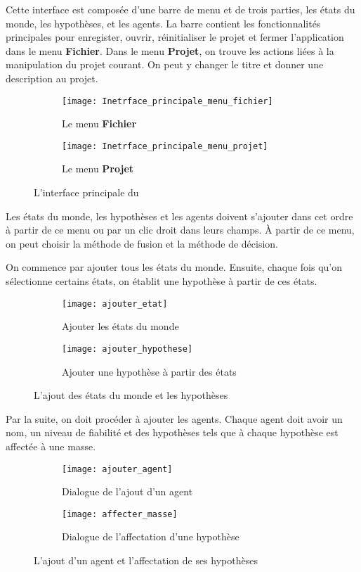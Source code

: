 Cette interface est composée d'une barre de menu et de trois parties, les états
du monde, les hypothèses, et les agents. La barre contient les fonctionnalités principales
pour enregister, ouvrir, réinitialiser le projet et fermer l'application dans le menu
\textbf{Fichier}. Dans le menu \textbf{Projet}, on trouve les actions liées à la manipulation
du projet courant. On peut y changer le titre et donner une description au projet.\\[1em]

\begin{figure}[H]
\begin{subfigure}{0.49\textwidth}
\texttt{[image: Inetrface\_principale\_menu\_fichier]}
\caption{Le menu \textbf{Fichier}}
\end{subfigure}
\hfill
\begin{subfigure}{0.49\textwidth}
\texttt{[image: Inetrface\_principale\_menu\_projet]}
\caption{Le menu \textbf{Projet}}
\end{subfigure}
\caption{L'interface principale du \appname}
\end{figure}

Les états du monde, les hypothèses et les agents doivent s'ajouter dans cet ordre à partir
de ce menu ou par un clic droit dans leurs champs. \`A partir de ce menu, on peut choisir la
méthode de fusion et la méthode de décision.

On commence par ajouter tous les états du monde. Ensuite, chaque fois qu'on sélectionne certains
états, on établit une hypothèse à partir de ces états.

\begin{figure}[H]
\begin{subfigure}{0.49\textwidth}
\texttt{[image: ajouter\_etat]}
\caption{Ajouter les états du monde}
\end{subfigure}
\hfill
\begin{subfigure}{0.49\textwidth}
\texttt{[image: ajouter\_hypothese]}
\caption{Ajouter une hypothèse à partir des états}
\end{subfigure}
\caption{L'ajout des états du monde et les hypothèses}
\end{figure}

Par la suite, on doit procéder à ajouter les agents. Chaque agent doit avoir un nom, un niveau de
fiabilité et des hypothèses tels que à chaque hypothèse est affectée à une masse.

\begin{figure}[H]
\begin{subfigure}{0.49\textwidth}
\texttt{[image: ajouter\_agent]}
\caption{Dialogue de l'ajout d'un agent}
\end{subfigure}
\hfill
\begin{subfigure}{0.49\textwidth}
\texttt{[image: affecter\_masse]}
\caption{Dialogue de l'affectation d'une hypothèse}
\end{subfigure}
\caption{L'ajout d'un agent et l'affectation de ses hypothèses}
\end{figure}


